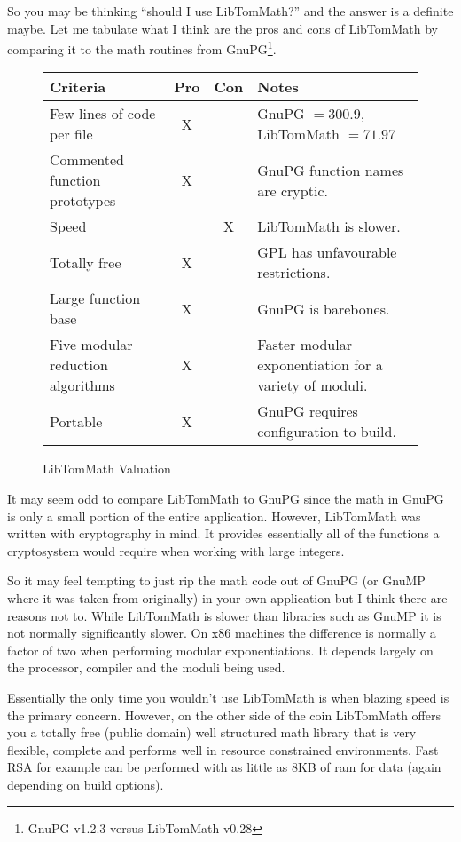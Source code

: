 \documentclass[synpaper]{book}
\begin{document}
So you may be thinking ``should I use LibTomMath?'' and the answer is a definite maybe.  Let me tabulate what I think
are the pros and cons of LibTomMath by comparing it to the math routines from GnuPG\footnote{GnuPG v1.2.3 versus LibTomMath v0.28}.

\newpage\begin{figure}[h]
\begin{small}
\begin{center}
\begin{tabular}{|l|c|c|l|}
\hline \textbf{Criteria} & \textbf{Pro} & \textbf{Con} & \textbf{Notes} \\
\hline Few lines of code per file & X & & GnuPG $ = 300.9$, LibTomMath  $ = 71.97$ \\
\hline Commented function prototypes & X && GnuPG function names are cryptic. \\
\hline Speed && X & LibTomMath is slower.  \\
\hline Totally free & X & & GPL has unfavourable restrictions.\\
\hline Large function base & X & & GnuPG is barebones. \\
\hline Five modular reduction algorithms & X & & Faster modular exponentiation for a variety of moduli. \\
\hline Portable & X & & GnuPG requires configuration to build. \\
\hline
\end{tabular}
\end{center}
\end{small}
\caption{LibTomMath Valuation}
\end{figure}

It may seem odd to compare LibTomMath to GnuPG since the math in GnuPG is only a small portion of the entire application.
However, LibTomMath was written with cryptography in mind.  It provides essentially all of the functions a cryptosystem
would require when working with large integers.

So it may feel tempting to just rip the math code out of GnuPG (or GnuMP where it was taken from originally) in your
own application but I think there are reasons not to.  While LibTomMath is slower than libraries such as GnuMP it is
not normally significantly slower.  On x86 machines the difference is normally a factor of two when performing modular
exponentiations.  It depends largely on the processor, compiler and the moduli being used.

Essentially the only time you wouldn't use LibTomMath is when blazing speed is the primary concern.  However,
on the other side of the coin LibTomMath offers you a totally free (public domain) well structured math library
that is very flexible, complete and performs well in resource constrained environments.  Fast RSA for example can
be performed with as little as 8KB of ram for data (again depending on build options).
\end{document}
